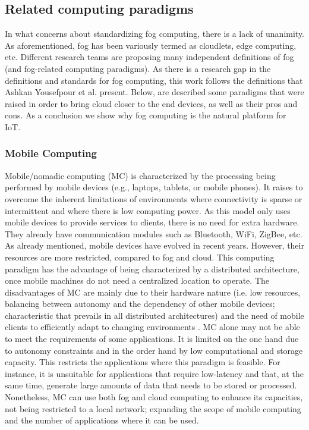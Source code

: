\subsection{Related computing paradigms}
\label{sec:Computingparadigms}
In what concerns about standardizing fog computing, there is a lack of unanimity. As aforementioned, fog has been variously termed as cloudlets, edge computing, etc. Different research teams are proposing many independent definitions of fog (and fog-related computing paradigms). As there is a research gap in the definitions and standards for fog computing, this work follows the definitions that Ashkan Yousefpour et al. \cite{yousefpour2018all} present. Below, are described some paradigms that were raised in order to bring cloud closer to the end devices, as well as their pros and cons. As a conclusion we show why fog computing is the natural platform for IoT.

\subsubsection{Mobile Computing}\label{subsec:MC}
Mobile/nomadic computing (MC) is characterized by the processing being performed by mobile devices (e.g., laptops, tablets, or mobile phones). It raises to overcome the inherent limitations of environments where connectivity is sparse or intermittent and where there is low computing power. As this model only uses mobile devices to provide services to clients, there is no need for extra hardware. They already have communication modules such as Bluetooth, WiFi, ZigBee, etc. As already mentioned, mobile devices have evolved in recent years. However, their resources are more restricted, compared to fog and cloud. This computing paradigm has the advantage of being characterized by a distributed architecture, once mobile machines do not need a centralized location to operate. The disadvantages of MC are mainly due to their hardware nature (i.e. low resources, balancing between autonomy and the dependency of other mobile devices; characteristic that prevails in all distributed architectures) and the need of mobile clients to efficiently adapt to changing environments \cite{satyanarayanan1996fundamental}. MC alone may not be able to meet the requirements of some applications. It is limited on the one hand due to autonomy constraints and in the order hand by low computational and storage capacity. This restricts the applications where this paradigm is feasible. For instance, it is unsuitable for applications that require low-latency and that, at the same time, generate large amounts of data that needs to be stored or processed. Nonetheless, MC can use both fog and cloud computing to enhance its capacities, not being restricted to a local network; expanding the scope of mobile computing and the number of applications where it can be used.

